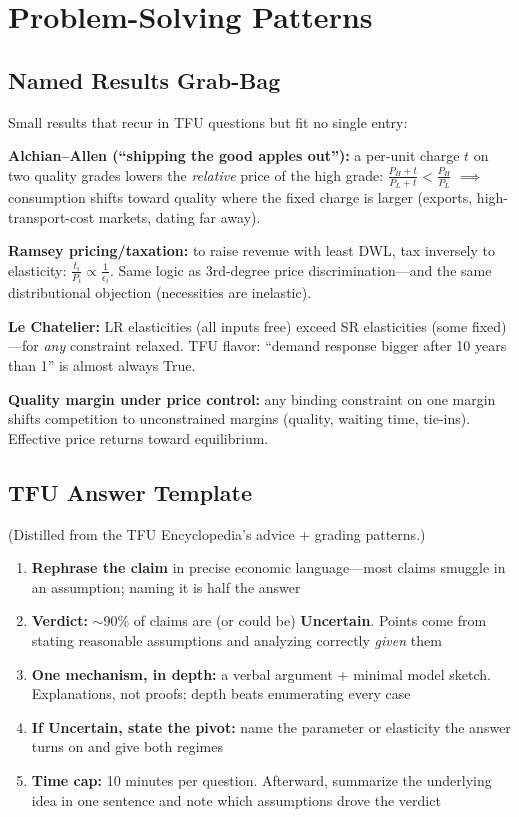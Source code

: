 \section{Problem-Solving Patterns}

\subsection{Named Results Grab-Bag}
Small results that recur in TFU questions but fit no single entry:

\textbf{Alchian--Allen (``shipping the good apples out''):} a per-unit charge $t$ on two quality grades lowers the \textit{relative} price of the high grade: $\frac{P_H + t}{P_L + t} < \frac{P_H}{P_L}$ $\implies$ consumption shifts toward quality where the fixed charge is larger (exports, high-transport-cost markets, dating far away).

\textbf{Ramsey pricing/taxation:} to raise revenue with least DWL, tax inversely to elasticity: $\frac{t_i}{P_i} \propto \frac{1}{\epsilon_i}$. Same logic as 3rd-degree price discrimination---and the same distributional objection (necessities are inelastic).

\textbf{Le Chatelier:} LR elasticities (all inputs free) exceed SR elasticities (some fixed)---for \textit{any} constraint relaxed. TFU flavor: ``demand response bigger after 10 years than 1'' is almost always True.

\textbf{Quality margin under price control:} any binding constraint on one margin shifts competition to unconstrained margins (quality, waiting time, tie-ins). Effective price returns toward equilibrium.

\subsection{TFU Answer Template}
(Distilled from the TFU Encyclopedia's advice + grading patterns.)
\begin{enumerate}[nosep]
    \item \textbf{Rephrase the claim} in precise economic language---most claims smuggle in an assumption; naming it is half the answer
    \item \textbf{Verdict:} $\sim$90\% of claims are (or could be) \textbf{Uncertain}. Points come from stating reasonable assumptions and analyzing correctly \textit{given} them
    \item \textbf{One mechanism, in depth:} a verbal argument + minimal model sketch. Explanations, not proofs; depth beats enumerating every case
    \item \textbf{If Uncertain, state the pivot:} name the parameter or elasticity the answer turns on and give both regimes
    \item \textbf{Time cap:} 10 minutes per question. Afterward, summarize the underlying idea in one sentence and note which assumptions drove the verdict
\end{enumerate}

